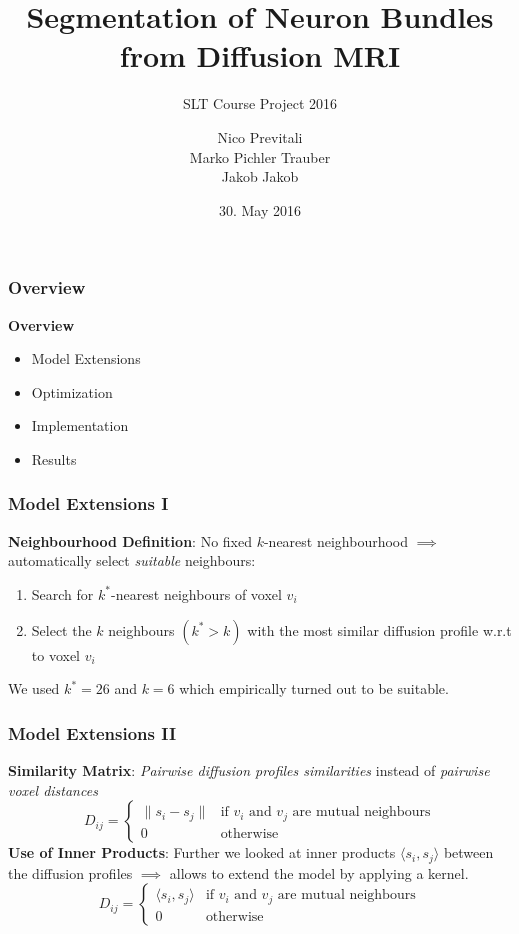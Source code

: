 \documentclass{beamer}
\title{\textbf{Segmentation of Neuron Bundles from Diffusion MRI}}
\subtitle{SLT Course Project 2016}
\author{ Nico Previtali \\ Marko Pichler Trauber \\ Jakob Jakob}
\date{30. May 2016}
\institute[ETH Zürich]
\begin{document}
\begin{frame}
 \titlepage
\end{frame}


\begin{frame}
\frametitle{Overview}
\textbf{Overview}
\begin{itemize}
	\item Model Extensions
	\item Optimization
	\item Implementation
	\item Results
\end{itemize}
\end{frame}

\begin{frame}
\frametitle{Model Extensions I}
\textbf{Neighbourhood Definition}: No fixed $k$-nearest neighbourhood $\implies$ automatically select \emph{suitable} neighbours:
\linebreak
\begin{enumerate}
	\item Search for $k^*$-nearest neighbours of voxel $v_i$
	\item Select the $k$ neighbours $(k^* > k)$ with the most similar diffusion profile w.r.t to voxel $v_i$\linebreak
\end{enumerate}
We used $k^* = 26$ and $k = 6$ which empirically turned out to be suitable.
\end{frame}


\begin{frame}
\frametitle{Model Extensions II}
\textbf{Similarity Matrix}: \emph{Pairwise diffusion profiles similarities} instead of \emph{pairwise voxel distances}
\begin{equation*} 
	D_{ij} = 
	\begin{cases}
		\lVert s_i - s_j \rVert & \text{if $v_i$ and $v_j$ are mutual neighbours} \\
		0 & \text{otherwise}
	\end{cases}
\end{equation*}
\textbf{Use of Inner Products}: Further we looked at inner products $\langle s_i, s_j \rangle$ between the diffusion profiles $\implies$ allows to extend the model by applying a kernel. 
\begin{equation*} 
	D_{ij} = 
	\begin{cases}
		\langle s_i, s_j \rangle & \text{if $v_i$ and $v_j$ are mutual neighbours} \\
		0 & \text{otherwise}
	\end{cases}
\end{equation*}
\end{frame}
\end{document}
